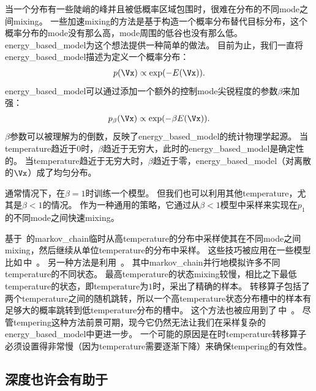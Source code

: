 当一个分布有一些陡峭的峰并且被低概率区域包围时，很难在分布的不同\gls{mode}之间\gls{mixing}。   %
一些加速\gls{mixing}的方法是基于构造一个概率分布替代目标分布，这个概率分布的\gls{mode}没有那么高，\gls{mode}周围的低谷也没有那么低。
\gls{energy_based_model}为这个想法提供一种简单的做法。
目前为止，我们一直将\gls{energy_based_model}描述为定义一个概率分布：   
\begin{align}
\label{eqn:1725}
p(\Vx) \propto \exp(-E(\Vx)).
\end{align}
\gls{energy_based_model}可以通过添加一个额外的控制\gls{mode}尖锐程度的参数$\beta$来加强：
\begin{align}
\label{eqn:1726}
p_{\beta}(\Vx) \propto \exp(-\beta E(\Vx)).
\end{align}
$\beta$参数可以被理解为的倒数，反映了\gls{energy_based_model}的统计物理学起源。
当\gls{temperature}趋近于0时，$\beta$趋近于无穷大，此时的\gls{energy_based_model}是确定性的。
当\gls{temperature}趋近于无穷大时，$\beta$趋近于零，\gls{energy_based_model}（对离散的$\Vx$）成了均匀分布。

通常情况下，在$\beta = 1$时训练一个模型。
但我们也可以利用其他\gls{temperature}，尤其是$\beta < 1$的情况。
作为一种通用的策略，它通过从$\beta<1$模型中采样来实现在$p_1$的不同\gls{mode}之间快速\gls{mixing}。

基于~\citep{Neal-1994}的\gls{markov_chain}临时从高\gls{temperature}的分布中采样使其在不同\gls{mode}之间\gls{mixing}，然后继续从单位\gls{temperature}的分布中采样。
这些技巧被应用在一些模型比如\,中~\citep{Salakhutdinov-2010}。
另一种方法是利用~\citep{Iba-2001}。
其中\gls{markov_chain}并行地模拟许多不同\gls{temperature}的不同状态。
最高\gls{temperature}的状态\gls{mixing}较慢，相比之下最低\gls{temperature}的状态，即\gls{temperature}为$1$时，采出了精确的样本。
转移算子包括了两个\gls{temperature}之间的随机跳转，所以一个高\gls{temperature}状态分布槽中的样本有足够大的概率跳转到低\gls{temperature}分布的槽中。
这个方法也被应用到了\,中~\citep{Desjardins-et-al-2010,Cho-et-al-2010}。
尽管\gls{tempering}这种方法前景可期，现今它仍然无法让我们在采样复杂的\gls{energy_based_model}中更进一步。
一个可能的原因是在时\gls{temperature}转移算子必须设置得非常慢（因为\gls{temperature}需要逐渐下降）来确保\gls{tempering}的有效性。


\subsection{深度也许会有助于}
\label{sec:depth_may_help_mixing}

